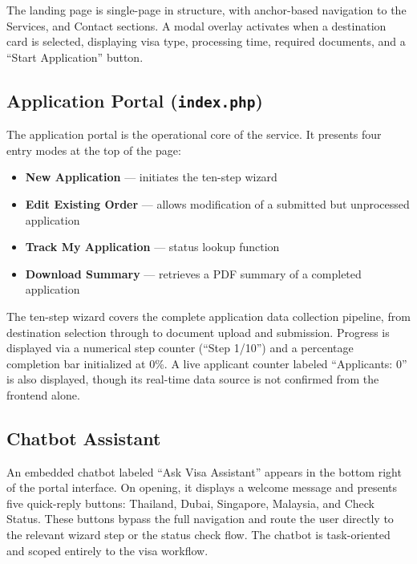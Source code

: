 \documentclass[journal, 10pt, twoside]{IEEEtran}
\begin{document}
The landing page is single-page in structure, with anchor-based
navigation to the Services, and Contact sections. A modal overlay
activates when a destination card is selected, displaying visa type,
processing time, required documents, and a ``Start Application'' button.

\subsection{Application Portal (\texttt{index.php})}
The application portal is the operational core of the service.
It presents four entry modes at the top of the page:
\begin{itemize}
  \item \textbf{New Application} --- initiates the ten-step wizard
  \item \textbf{Edit Existing Order} --- allows modification of a
        submitted but unprocessed application
  \item \textbf{Track My Application} --- status lookup function
  \item \textbf{Download Summary} --- retrieves a PDF summary of
        a completed application
\end{itemize}

The ten-step wizard covers the complete application data collection
pipeline, from destination selection through to document upload and
submission. Progress is displayed via a numerical step counter
(``Step 1/10'') and a percentage completion bar initialized at 0\%.
A live applicant counter labeled ``Applicants: 0'' is also displayed,
though its real-time data source is not confirmed from the frontend alone.

\subsection{Chatbot Assistant}
An embedded chatbot labeled ``Ask Visa Assistant'' appears in the bottom
right of the portal interface. On opening, it displays a welcome message
and presents five quick-reply buttons: Thailand, Dubai, Singapore, Malaysia,
and Check Status. These buttons bypass the full navigation and route the
user directly to the relevant wizard step or the status check flow. The
chatbot is task-oriented and scoped entirely to the visa workflow.
\end{document}
